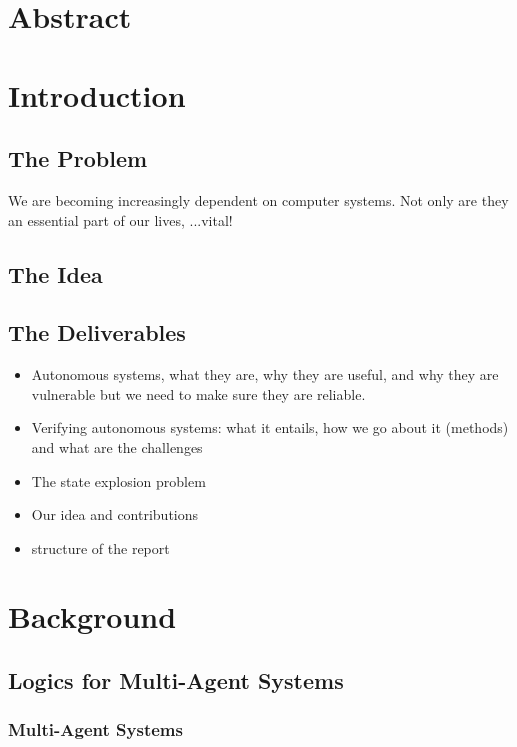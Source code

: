 \documentclass[11pt]{article}
\begin{document}
\tableofcontents
\section*{Abstract}

\section{Introduction}

\subsection{The Problem}

We are becoming increasingly dependent on computer systems. Not only are they an essential part of our lives, ...vital!



\subsection{The Idea}

\subsection{The Deliverables}


\begin{itemize}
\item Autonomous systems, what they are, why they are useful, and why they are vulnerable but we need to make sure they are reliable.
\item Verifying autonomous systems: what it entails, how we go about it (methods) and what are the challenges
\item The state explosion problem
\item Our idea and contributions
\item structure of the report
\end{itemize}

\section{Background}

\subsection{Logics for Multi-Agent Systems}

\subsubsection{Multi-Agent Systems}
\end{document}
